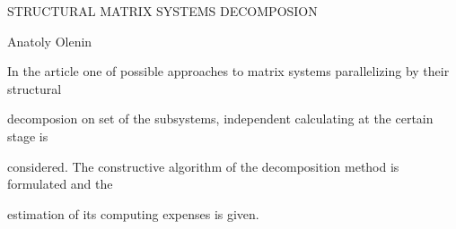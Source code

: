 STRUCTURAL MATRIX SYSTEMS DECOMPOSION


Anatoly Olenin


In the article one of possible approaches to matrix systems parallelizing by their structural


decomposion on set of the subsystems, independent calculating at the certain stage is


considered. The constructive algorithm of the decomposition method is formulated and the


estimation of its computing expenses is given.





